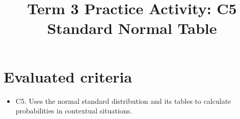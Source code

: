 \newcommand{\StandardNormalTwoTailGraph}[6]{%
	\begin{center}
		\begin{tikzpicture}
			\pgfmathsetmacro{\LeftCenterX}{(-3.5 + (#1))/2}
			\pgfmathsetmacro{\LeftCenterY}{0.5*exp(-(\LeftCenterX)^2/2)/sqrt(2*pi)}
			\pgfmathsetmacro{\RightCenterX}{((#2)+3.5)/2}
			\pgfmathsetmacro{\RightCenterY}{0.5*exp(-(\RightCenterX)^2/2)/sqrt(2*pi)}
			\begin{axis}[
				width=11cm,
				height=6cm,
				axis lines=left,
				xlabel={$z$},
				ylabel={$\phi(z)$},
				xmin=-3.5, xmax=3.5,
				ymin=0, ymax=0.45,
				grid=both,
				xtick={-3,-2,-1,0,1,2,3,#1,#2},
				tick label style={font=\scriptsize}
				]
				\addplot[domain=-3.5:#1, draw=none, fill=blue!55, fill opacity=0.55] {exp(-x^2/2)/sqrt(2*pi)} \closedcycle;
				\addplot[domain=#2:3.5, draw=none, fill=blue!55, fill opacity=0.55] {exp(-x^2/2)/sqrt(2*pi)} \closedcycle;
				\addplot[smooth, thick, black, domain=-3.5:3.5] {exp(-x^2/2)/sqrt(2*pi)};
				\addplot[dashed] coordinates {(#1,0) (#1,{exp(-(#1)^2/2)/sqrt(2*pi)})};
				\addplot[dashed] coordinates {(#2,0) (#2,{exp(-(#2)^2/2)/sqrt(2*pi)})};
				\node[font=\scriptsize, anchor=south] at (axis cs:#1,0.04) {$#3$};
				\node[font=\scriptsize, anchor=south] at (axis cs:#2,0.04) {$#4$};
				\draw[->, thick]
				(axis cs:\LeftCenterX,\LeftCenterY)
				-- (axis cs:-1.25,0.33);
				\node[
				font=\scriptsize,
				anchor=east,
				fill=white,
				inner sep=2pt
				] at (axis cs:-1.25,0.33) {$#5$};
				\draw[->, thick]
				(axis cs:\RightCenterX,\RightCenterY)
				-- (axis cs:1.25,0.33);
				\node[
				font=\scriptsize,
				anchor=west,
				fill=white,
				inner sep=2pt
				] at (axis cs:1.25,0.33) {$#6$};
			\end{axis}
		\end{tikzpicture}
	\end{center}
}

\title{Term 3 Practice Activity: C5 Standard Normal Table}
\author{}
\date{}


	\maketitle
	
	\setcounter{tocdepth}{1}
	\setcounter{secnumdepth}{2}
	\tableofcontents
	
	\section*{Evaluated criteria}
	\begin{itemize}
		\item C5. Uses the normal standard distribution and its tables to calculate probabilities in contextual situations.
	\end{itemize}
	
